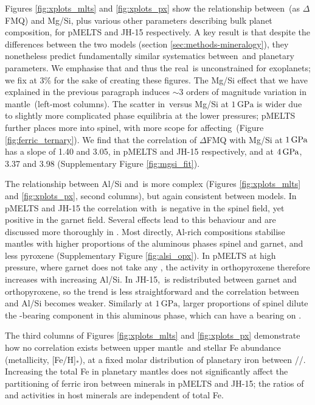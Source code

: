 Figures \ref{fig:xplots_mlts} and \ref{fig:xplots_px} show the relationship between \fo\,(as $\Delta$FMQ) and Mg/Si, plus various other parameters describing bulk planet composition, for pMELTS and JH-15 respectively. A key result is that despite the differences between the two models (section \ref{sec:methods-mineralogy}), they nonetheless predict fundamentally similar systematics between \fo\,and planetary parameters. We emphasise that \xfer\;and thus the real \fo\,is unconstrained for exoplanets; we fix \xfer\;at 3\% for the sake of creating these figures. The Mg/Si effect that we have explained in the previous paragraph induces $\sim$3 orders of magnitude variation in mantle \fo\,(left-most columns). The scatter in \fo\,versus Mg/Si at $1\,\text{GPa}$ is wider due to slightly more complicated phase equilibria at the lower pressures; pMELTS further places more \ferric\;into spinel, with more scope for affecting \fo\,(Figure \ref{fig:ferric_ternary}). We find that the correlation of $\Delta$FMQ with Mg/Si at $1\,{\rm GPa}$ has a slope of 1.40 and 3.05, in pMELTS and JH-15 respectively, and at $4\,{\rm GPa}$, 3.37 and 3.98 (Supplementary Figure \ref{fig:mgsi_fit}).

The relationship between Al/Si and \fo\,is more complex (Figures \ref{fig:xplots_mlts} and \ref{fig:xplots_px}, second columns), but again consistent between models. In pMELTS and JH-15 the correlation with \fo\,is negative in the spinel field, yet positive in the garnet field. Several effects lead to this behaviour and are discussed more thoroughly in \citet{stolper_effects_2020}. Most directly, Al-rich compositions stabilise mantles with higher proportions of the aluminous phases spinel and garnet, and less pyroxene (Supplementary Figure \ref{fig:alsi_opx}). In pMELTS at high pressure, where garnet does not take any \ferric, the  activity in orthopyroxene therefore increases with increasing Al/Si. In JH-15, \ferric\,is redistributed between garnet and orthopyroxene, so the trend is less straightforward and the correlation between \fo\,and Al/Si becomes weaker. Similarly at $1\,\text{GPa}$, larger proportions of spinel dilute the \ferric-bearing component in this aluminous phase, which can have a bearing on \fo.


The third columns of Figures \ref{fig:xplots_mlts} and \ref{fig:xplots_px} demonstrate how no correlation exists between upper mantle \fo\,and stellar Fe abundance (metallicity, [Fe/H]$_\ast$), at a fixed molar distribution of planetary iron between /\ferrous/\ferric. Increasing the total Fe in planetary mantles does not significantly affect the partitioning of ferric iron between minerals in pMELTS and JH-15; the ratios of  and  activities in host minerals are independent of total Fe.

